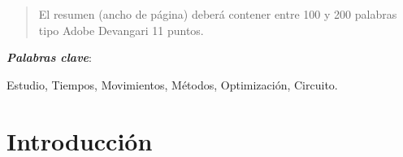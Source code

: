     \maketitle
    \thispagestyle{fancy}
    
    
    
    \begin{abstract}
    \noindent 
    El resumen (ancho de página) deberá contener entre 100 y 200 palabras tipo Adobe Devangari 11 puntos.
    
    \end{abstract}
    \textbf{\textit{Palabras clave}}:
    
        Estudio, Tiempos, Movimientos, Métodos, Optimización, Circuito. 
    
    \section{Introducción}
    
